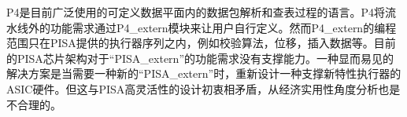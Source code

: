 









 \label{chap43}

P4是目前广泛使用的可定义数据平面内的数据包解析和查表过程的语言。P4将流水线外的功能需求通过P4\_extern模块来让用户自行定义。然而P4\_extern的编程范围只在PISA提供的执行器序列之内，例如校验算法，位移，插入数据等。目前的PISA芯片架构对于“PISA\_extern”的功能需求没有支撑能力。一种显而易见的解决方案是当需要一种新的“PISA\_extern”时，重新设计一种支撑新特性执行器的ASIC硬件。但这与PISA高灵活性的设计初衷相矛盾，从经济实用性角度分析也是不合理的。

